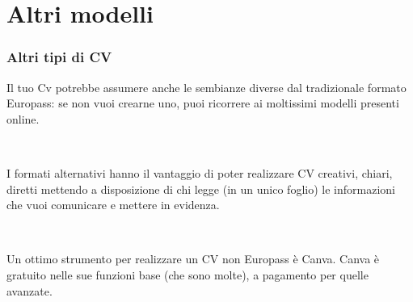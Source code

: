 \documentclass[handout]{beamer}
\begin{document}
\section{Altri modelli}

\begin{frame}
\frametitle{Altri tipi di CV}
Il tuo Cv potrebbe assumere anche le sembianze diverse dal tradizionale formato Europass: se non vuoi crearne uno, puoi ricorrere ai moltissimi modelli presenti online.\pause

~

I formati alternativi hanno il vantaggio di poter realizzare CV creativi, chiari, diretti mettendo a disposizione di chi legge (\alert{in un unico foglio}) le informazioni che vuoi comunicare e mettere in evidenza.\pause

~

Un ottimo strumento per realizzare un CV non Europass è \alert{Canva}. Canva è gratuito nelle sue funzioni base (che sono molte), a pagamento per quelle avanzate.
\end{frame}
\end{document}

